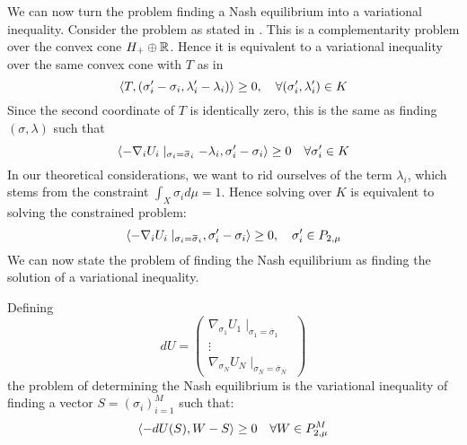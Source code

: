 We can now turn the problem finding a Nash equilibrium into a variational inequality. Consider the problem as stated in . This is a complementarity problem over the convex cone $H_+ \oplus \mathbb{R}$. Hence it is equivalent to a variational inequality over the same convex cone with $T$ as in 
\begin{equation}
  \left \langle T,(\sigma_i' -\sigma_i,\lambda_i'-\lambda_i) \right \rangle \geq 0, \quad \forall (\sigma_i', \lambda_i') \in K
\end{equation}
Since the second coordinate of $T$ is identically zero, this is the same as finding $(\sigma,\lambda)$ such that
\begin{equation}
  \label{eq:simp_var_eq}
  \ip{-\nabla_i U_i \mid_{\sigma_i = \overbar{\sigma}_i} - \lambda_i}{\sigma_i' -\sigma_i} \geq 0 \quad \forall \sigma_i' \in K
\end{equation}
In our theoretical considerations, we want to rid ourselves of the term $\lambda_i$, which stems from the constraint $\int_X \sigma_i d\mu = 1$. Hence solving  over $K$ is equivalent to solving the constrained problem:
\begin{equation}
  \ip{-\nabla_i U_i \mid_{\sigma_i = \overbar{\sigma}_i}}{\sigma_i' -\sigma_i} \geq 0, \quad \sigma_i' \in P_{2,\mu}
\end{equation}
We can now state the problem of finding the Nash equilibrium  as finding the solution of a variational inequality.
\begin{definition}
  \label{def:var_eq_nash}
  Defining
\begin{equation}
  dU = \begin{pmatrix} \nabla_{\sigma_1} U_1 \mid_{\sigma_1 = \overbar{\sigma}_1}\\
      \vdots \\
      \nabla_{\sigma_N} U_N \mid_{\sigma_N = \overbar{\sigma}_N} \end{pmatrix}
\end{equation}
the problem of determining the Nash equilibrium  is the variational inequality of finding a vector $S = (\sigma_i)_{i=1}^M$ such that:
\begin{equation}
  \left \langle -dU(S),W-S \right \rangle \geq 0 \quad \forall W\in P_{2,\mu}^M
\end{equation}
\end{definition}

